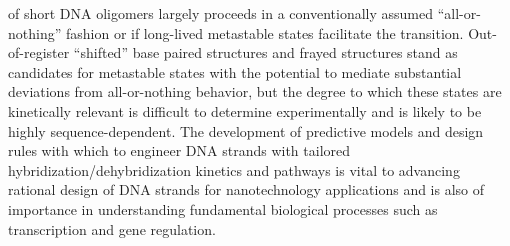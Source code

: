 \documentclass[journal=jpcbfk,manuscript=article]{achemso}
\begin{document}
of short DNA oligomers largely proceeds in a conventionally assumed ``all-or-nothing'' fashion or if long-lived metastable states facilitate the transition.\citep{Araque2016LatticeCooperativity, Sikora2013ModelingIntermediates, Wyer2014KineticsAT-tracts, Sanstead2016, Sanstead2018DirectDehybridization, Xiao2019} Out-of-register ``shifted'' base paired structures \citep{Hinckley2014Coarse-grainedEffects, Maciejczyk2014DNAModel, Araque2016LatticeCooperativity, Xiao2019, Romano2013DNADependence,Flamm2000RNAResolution} and frayed structures \citep{Zgarbova2014BaseRNA, Nonin1995TerminalFraying, Nikolova2012ProbingSimulations, Andreatta2006UltrafastHelix} stand as candidates for metastable states with the potential to mediate substantial deviations from all-or-nothing behavior, but the degree to which these states are kinetically relevant is difficult to determine experimentally and is likely to be highly sequence-dependent. The development of predictive models and design rules with which to engineer DNA strands with tailored hybridization/dehybridization kinetics and pathways is vital to advancing rational design of DNA strands for nanotechnology applications and is also of importance in understanding fundamental biological processes such as transcription and gene regulation.
\end{document}
